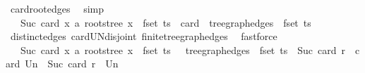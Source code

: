 \begin{isabellebody}
\ card{\isacharunderscore}{\kern0pt}root{\isacharunderscore}{\kern0pt}edges\ \isamarkupfalse%
\ simp\isanewline
\ \ \isamarkupfalse%
\ \isamarkupfalse%
\ {\isachardoublequoteopen}{\isasymdots}\ {\isacharequal}{\kern0pt}\ Suc\ {\isacharparenleft}{\kern0pt}card\ {\isacharparenleft}{\kern0pt}{\isacharparenleft}{\kern0pt}{\isasymlambda}x{\isachardot}{\kern0pt}\ {\isacharbraceleft}{\kern0pt}a{\isacharcomma}{\kern0pt}\ root{\isacharunderscore}{\kern0pt}stree\ x{\isacharbraceright}{\kern0pt}{\isacharparenright}{\kern0pt}\ {\isacharbackquote}{\kern0pt}\ fset\ ts{\isacharparenright}{\kern0pt}\ {\isacharplus}{\kern0pt}\ card\ {\isacharparenleft}{\kern0pt}{\isasymUnion}\ {\isacharparenleft}{\kern0pt}tree{\isacharunderscore}{\kern0pt}graph{\isacharunderscore}{\kern0pt}edges\ {\isacharbackquote}{\kern0pt}\ fset\ ts{\isacharparenright}{\kern0pt}{\isacharparenright}{\kern0pt}{\isacharparenright}{\kern0pt}{\isachardoublequoteclose}\isanewline
\ \ \ \ \isamarkupfalse%
\ distinct{\isacharunderscore}{\kern0pt}edges\ card{\isacharunderscore}{\kern0pt}UN{\isacharunderscore}{\kern0pt}disjoint{\isacharprime}{\kern0pt}\ finite{\isacharunderscore}{\kern0pt}tree{\isacharunderscore}{\kern0pt}graph{\isacharunderscore}{\kern0pt}edges\ \isamarkupfalse%
\ fastforce\isanewline
\ \ \isamarkupfalse%
\ \isamarkupfalse%
\ {\isachardoublequoteopen}{\isasymdots}\ {\isacharequal}{\kern0pt}\ Suc\ {\isacharparenleft}{\kern0pt}card\ {\isacharparenleft}{\kern0pt}{\isacharparenleft}{\kern0pt}{\isasymlambda}x{\isachardot}{\kern0pt}\ {\isacharbraceleft}{\kern0pt}a{\isacharcomma}{\kern0pt}\ root{\isacharunderscore}{\kern0pt}stree\ x{\isacharbraceright}{\kern0pt}{\isacharparenright}{\kern0pt}\ {\isacharbackquote}{\kern0pt}\ fset\ ts\ {\isasymunion}\ {\isacharparenleft}{\kern0pt}{\isasymUnion}\ {\isacharparenleft}{\kern0pt}tree{\isacharunderscore}{\kern0pt}graph{\isacharunderscore}{\kern0pt}edges\ {\isacharbackquote}{\kern0pt}\ fset\ ts{\isacharparenright}{\kern0pt}{\isacharparenright}{\kern0pt}{\isacharparenright}{\kern0pt}{\isacharparenright}{\kern0pt}{\isachardoublequoteclose}\ {\isacharparenleft}{\kern0pt}\ {\isachardoublequoteopen}Suc\ {\isacharparenleft}{\kern0pt}card\ {\isacharquery}{\kern0pt}r\ {\isacharplus}{\kern0pt}\ card\ {\isacharquery}{\kern0pt}Un{\isacharparenright}{\kern0pt}\ {\isacharequal}{\kern0pt}\ Suc\ {\isacharparenleft}{\kern0pt}card\ {\isacharparenleft}{\kern0pt}{\isacharquery}{\kern0pt}r\ {\isasymunion}\ {\isacharquery}{\kern0pt}Un{\isacharparenright}{\kern0pt}{\isacharparenright}{\kern0pt}{\isachardoublequoteclose}{\isacharparenright}{\kern0pt}\isanewline

\end{isabellebody}

